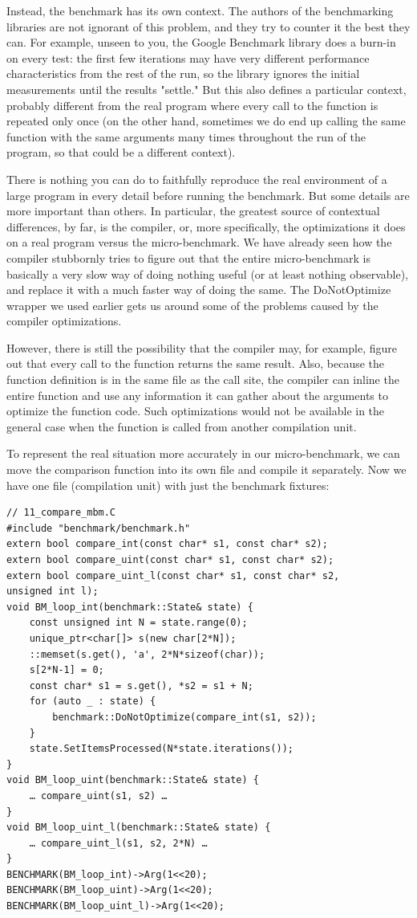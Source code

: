 Instead, the benchmark has its own context. The authors of the benchmarking libraries are not ignorant of this problem, and they try to counter it the best they can. For example, unseen to you, the Google Benchmark library does a burn-in on every test: the first few iterations may have very different performance characteristics from the rest of the run, so the library ignores the initial measurements until the results "settle." But this also defines a particular context, probably different from the real program where every call to the function is repeated only once (on the other hand, sometimes we do end up calling the same function with the same arguments many times throughout the run of the program, so that could be a different context).

There is nothing you can do to faithfully reproduce the real environment of a large program in every detail before running the benchmark. But some details are more important than others. In particular, the greatest source of contextual differences, by far, is the compiler, or, more specifically, the optimizations it does on a real program versus the micro-benchmark. We have already seen how the compiler stubbornly tries to figure out that the entire micro-benchmark is basically a very slow way of doing nothing useful (or at least nothing observable), and replace it with a much faster way of doing the same. The DoNotOptimize wrapper we used earlier gets us around some of the problems caused by the compiler optimizations.

However, there is still the possibility that the compiler may, for example, figure out that every call to the function returns the same result. Also, because the function definition is in the same file as the call site, the compiler can inline the entire function and use any information it can gather about the arguments to optimize the function code. Such optimizations would not be available in the general case when the function is called from another compilation unit. 

To represent the real situation more accurately in our micro-benchmark, we can move the comparison function into its own file and compile it separately. Now we have one file (compilation unit) with just the benchmark fixtures:

\begin{lstlisting}[style=styleCXX]
// 11_compare_mbm.C
#include "benchmark/benchmark.h"
extern bool compare_int(const char* s1, const char* s2);
extern bool compare_uint(const char* s1, const char* s2);
extern bool compare_uint_l(const char* s1, const char* s2,
unsigned int l);
void BM_loop_int(benchmark::State& state) {
	const unsigned int N = state.range(0);
	unique_ptr<char[]> s(new char[2*N]);
	::memset(s.get(), 'a', 2*N*sizeof(char));
	s[2*N-1] = 0;
	const char* s1 = s.get(), *s2 = s1 + N;
	for (auto _ : state) {
		benchmark::DoNotOptimize(compare_int(s1, s2));
	}
	state.SetItemsProcessed(N*state.iterations());
}
void BM_loop_uint(benchmark::State& state) {
	… compare_uint(s1, s2) …
}
void BM_loop_uint_l(benchmark::State& state) {
	… compare_uint_l(s1, s2, 2*N) …
}
BENCHMARK(BM_loop_int)->Arg(1<<20);
BENCHMARK(BM_loop_uint)->Arg(1<<20);
BENCHMARK(BM_loop_uint_l)->Arg(1<<20);
\end{lstlisting}

